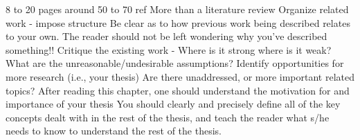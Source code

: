 8 to 20 pages around 50 to 70 ref
More than a literature review
Organize related work - impose structure
Be clear as to how previous work being described relates to your own.
The reader should not be left wondering why you've described something!!
Critique the existing work - Where is it strong where is it weak? What are the unreasonable/undesirable assumptions?
Identify opportunities for more research (i.e., your thesis) Are there unaddressed, or more important related topics?
After reading this chapter, one should understand the motivation for and importance of your thesis
You should clearly and precisely define all of the key concepts dealt with in the rest of the thesis, and teach the reader what s/he needs to know to understand the rest of the thesis.
